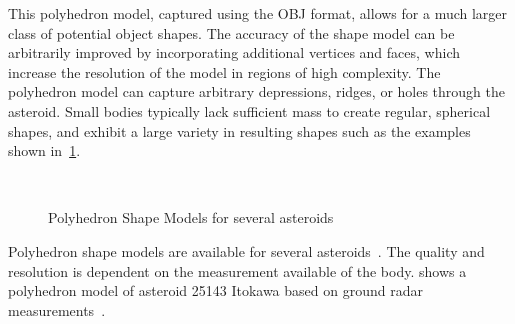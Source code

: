 This polyhedron model, captured using the OBJ format, allows for a much larger class of potential object shapes. 
The accuracy of the shape model can be arbitrarily improved by incorporating additional vertices and faces, which increase the resolution of the model in regions of high complexity.
The polyhedron model can capture arbitrary depressions, ridges, or holes through the asteroid.
Small bodies typically lack sufficient mass to create regular, spherical shapes, and exhibit a large variety in resulting shapes such as the examples shown in~\cref{fig:asteroid_shape}.
\begin{figure}
    \centering
    ~
    ~
    \caption{Polyhedron Shape Models for several asteroids~\label{fig:asteroid_shape}}
\end{figure}
Polyhedron shape models are available for several asteroids~\cite{neese2004,gaskell2008b}.
The quality and resolution is dependent on the measurement available of the body.
 shows a polyhedron model of asteroid 25143 Itokawa based on ground radar measurements~\cite{neese2004}.
